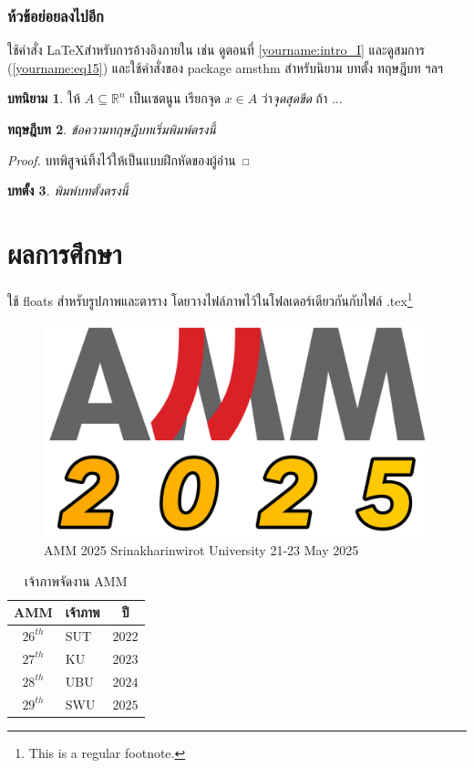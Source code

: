 \documentclass[12pt, a4paper, twoside]{article}
\theoremstyle{plain}
\newtheorem{theorem}{ทฤษฎีบท}[section]
\newtheorem{lemma}[theorem]{บทตั้ง}
\theoremstyle{definition}
\newtheorem{definition}[theorem]{บทนิยาม}
\theoremstyle{remark}
\numberwithin{equation}{section}
\begin{document}
\subsubsection{ห้วข้อย่อยลงไปอีก}
ใช้คำสั่ง \LaTeX สำหรับการอ้างอิงภายใน เช่น ดูตอนที่ \ref{yourname:intro_I} และดูสมการ (\ref{yourname:eq15}) และใช้คำสั่งของ package amsthm สำหรับนิยาม บทตั้ง ทฤษฎีบท ฯลฯ  

\begin{definition}
ให้ $A \subseteq \mathbb{R}^n$ เป็นเซตนูน  เรียกจุด $x \in A$ ว่า\emph{จุดสุดขีด} ถ้า $\dots$
\end{definition}

\begin{theorem}
	ข้อความทฤษฎีบทเริ่มพิมพ์ตรงนี้
\end{theorem}
\begin{proof}
   บทพิสูจน์ทิ้งไว้ให้เป็นแบบฝึกหัดของผู้อ่าน
\end{proof}

\begin{lemma}
	พิมพ์บทตั้งตรงนี้
\end{lemma}

\section{ผลการศึกษา}
ใช้ floats สำหรับรูปภาพและตาราง โดยวางไฟล์ภาพไว้ในโฟลเดอร์เดียวกันกับไฟล์ .tex\footnote{This is a regular footnote.}
     
\begin{figure}[h]
\centering
\includegraphics[scale=0.1]{amm2025_logo_small_color.png}
\caption{AMM 2025 Srinakharinwirot University 21-23 May 2025}
\label{yourname:ammlogo}
\end{figure}

\begin{table}[h]
\caption{เจ้าภาพจัดงาน AMM}
\begin{center}
\begin{tabular}{clc}  \hline
 AMM & เจ้าภาพ & ปี\\ \hline\hline
 $26^{th}$ & SUT &$2022$ \\ 
$27^{th}$ & KU  &$2023$ \\ 
$28^{th}$ & UBU &$2024$ \\ 
$29^{th}$ & SWU &$2025$ \\ 	 
\hline
\end{tabular}
\label{yourname:tableofamm}
\end{center}
\end{table}
\end{document}
